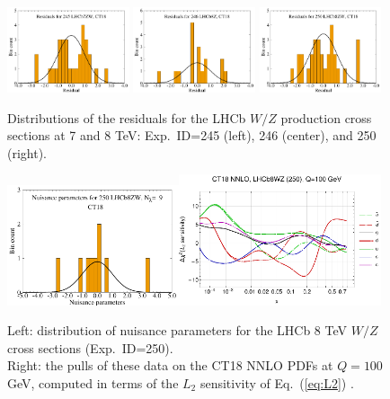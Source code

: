 \begin{figure}[t]
	\includegraphics[width=0.32\textwidth]{./fig/res_his_CT18-245_4_ect.pdf}
	\includegraphics[width=0.32\textwidth]{./fig/res_his_CT18-246_4_ect.pdf}
	\includegraphics[width=0.32\textwidth]{./fig/res_his_CT18-250_4_ect.pdf}
	\caption{Distributions of the residuals for the LHCb $W/Z$ production cross sections at 7 and 8 TeV: Exp.~ID=245 (left), 246 (center), and 250 (right).
		\label{fig:res_rk_1}}
\end{figure}



\begin{figure}[t]
	\includegraphics[width=0.45\textwidth]{./fig/rk_his_CT18-250__4_ect.pdf}\quad\includegraphics[width=0.53\textwidth]{./fig/250_CT18_L2_Q100.pdf}
	\caption{Left: distribution of nuisance parameters for the LHCb 8 TeV $W/Z$ cross sections (Exp.~ID=250).\\ Right: the pulls of these data on the CT18 NNLO PDFs at $Q=100$ GeV, computed in terms
of the $L_2$ sensitivity of Eq.~(\ref{eq:L2}) \cite{CT18L2Sensitivity}.
		\label{fig:res_rk_3}}
\end{figure}


